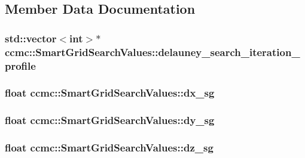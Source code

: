 \subsection{Member Data Documentation}
\hypertarget{structccmc_1_1_smart_grid_search_values_a092fbfb584bde5bfd2889b249c0cf683}{
\subsubsection[{delauney\-\_\-search\-\_\-iteration\-\_\-profile}]{\setlength{\rightskip}{0pt plus 5cm}std\-::vector$<$int$>$$\ast$ ccmc\-::\-Smart\-Grid\-Search\-Values\-::delauney\-\_\-search\-\_\-iteration\-\_\-profile}}\label{structccmc_1_1_smart_grid_search_values_a092fbfb584bde5bfd2889b249c0cf683}
\hypertarget{structccmc_1_1_smart_grid_search_values_a8720013dfad578743e4de0db55e329ed}{
\subsubsection[{dx\-\_\-sg}]{\setlength{\rightskip}{0pt plus 5cm}float ccmc\-::\-Smart\-Grid\-Search\-Values\-::dx\-\_\-sg}}\label{structccmc_1_1_smart_grid_search_values_a8720013dfad578743e4de0db55e329ed}
\hypertarget{structccmc_1_1_smart_grid_search_values_a89883d9831bc0424f2e155217f4746e5}{
\subsubsection[{dy\-\_\-sg}]{\setlength{\rightskip}{0pt plus 5cm}float ccmc\-::\-Smart\-Grid\-Search\-Values\-::dy\-\_\-sg}}\label{structccmc_1_1_smart_grid_search_values_a89883d9831bc0424f2e155217f4746e5}
\hypertarget{structccmc_1_1_smart_grid_search_values_a2e9f13ff4816d05b96220d07d0878b05}{
\subsubsection[{dz\-\_\-sg}]{\setlength{\rightskip}{0pt plus 5cm}float ccmc\-::\-Smart\-Grid\-Search\-Values\-::dz\-\_\-sg}}\label{structccmc_1_1_smart_grid_search_values_a2e9f13ff4816d05b96220d07d0878b05}
